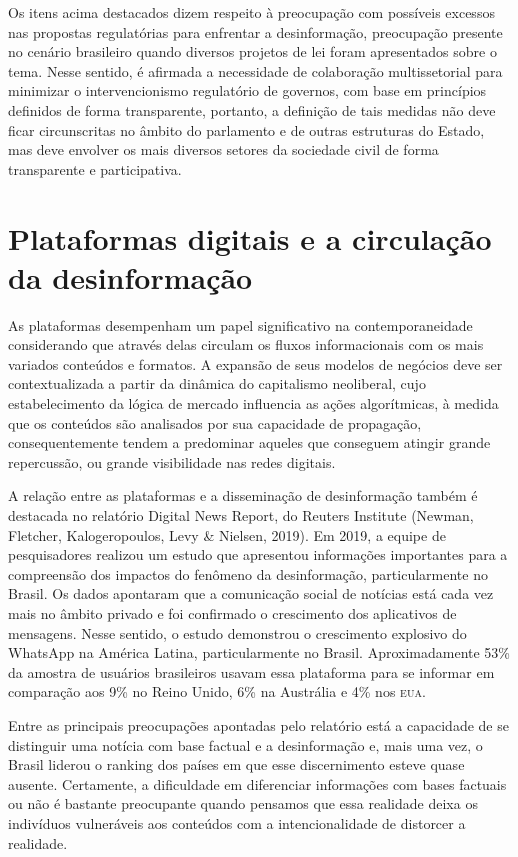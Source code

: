 Os itens acima destacados dizem respeito à preocupação com possíveis
excessos nas propostas regulatórias para enfrentar a desinformação,
preocupação presente no cenário brasileiro quando diversos projetos de
lei foram apresentados sobre o tema. Nesse sentido, é afirmada a
necessidade de colaboração multissetorial para minimizar o
intervencionismo regulatório de governos, com base em princípios
definidos de forma transparente, portanto, a definição de tais medidas
não deve ficar circunscritas no âmbito do parlamento e de outras
estruturas do Estado, mas deve envolver os mais diversos setores da
sociedade civil de forma transparente e participativa.

\section{Plataformas digitais e a circulação da desinformação}

As plataformas desempenham um papel significativo na contemporaneidade
considerando que através delas circulam os fluxos informacionais com os
mais variados conteúdos e formatos. A expansão de seus modelos de
negócios deve ser contextualizada a partir da dinâmica do capitalismo
neoliberal, cujo estabelecimento da lógica de mercado influencia as
ações algorítmicas, à medida que os conteúdos são analisados por sua
capacidade de propagação, consequentemente tendem a predominar aqueles
que conseguem atingir grande repercussão, ou grande visibilidade nas
redes digitais.

A relação entre as plataformas e a disseminação de desinformação também
é destacada no relatório Digital News Report, do Reuters Institute (Newman, Fletcher, Kalogeropoulos, Levy \& Nielsen, 2019). Em 2019, a
equipe de pesquisadores realizou um estudo que apresentou informações
importantes para a compreensão dos impactos do fenômeno da
desinformação, particularmente no Brasil. Os dados apontaram que a
comunicação social de notícias está cada vez mais no âmbito privado e
foi confirmado o crescimento dos aplicativos de mensagens. Nesse
sentido, o estudo demonstrou o crescimento explosivo do WhatsApp na
América Latina, particularmente no Brasil. Aproximadamente 53\% da
amostra de usuários brasileiros usavam essa plataforma para se informar
em comparação aos 9\% no Reino Unido, 6\% na Austrália e 4\% nos \textsc{eua}.

Entre as principais preocupações apontadas pelo relatório está a
capacidade de se distinguir uma notícia com base factual e a
desinformação e, mais uma vez, o Brasil liderou o ranking dos países em
que esse discernimento esteve quase ausente. Certamente, a dificuldade
em diferenciar informações com bases factuais ou não é bastante
preocupante quando pensamos que essa realidade deixa os indivíduos
vulneráveis aos conteúdos com a intencionalidade de distorcer a
realidade.

